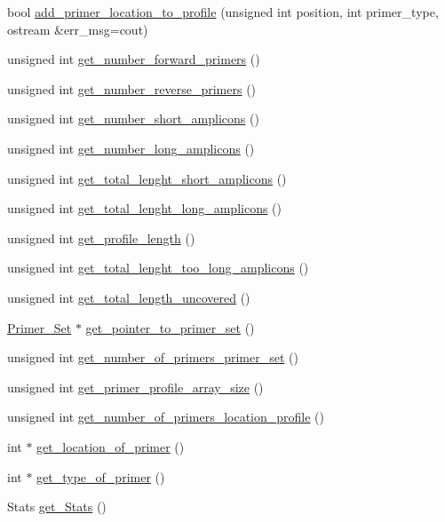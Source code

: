 \begin{DoxyCompactItemize}
\item 
bool \mbox{\hyperlink{class_p_c_r___profile_a95758e5dff688b7b85bd1009ba28e112}{add\+\_\+primer\+\_\+location\+\_\+to\+\_\+profile}} (unsigned int position, int primer\+\_\+type, ostream \&err\+\_\+msg=cout)
\item 
unsigned int \mbox{\hyperlink{class_p_c_r___profile_a5222753c5f4b1568f7254be8fbc7c862}{get\+\_\+number\+\_\+forward\+\_\+primers}} ()
\item 
unsigned int \mbox{\hyperlink{class_p_c_r___profile_a5470c4248e9c347b66ee1ad977d2a6f9}{get\+\_\+number\+\_\+reverse\+\_\+primers}} ()
\item 
unsigned int \mbox{\hyperlink{class_p_c_r___profile_ae1470db4482cb29be8e29b96f913023c}{get\+\_\+number\+\_\+short\+\_\+amplicons}} ()
\item 
unsigned int \mbox{\hyperlink{class_p_c_r___profile_a91a98d9005a63450de3f782c9374972a}{get\+\_\+number\+\_\+long\+\_\+amplicons}} ()
\item 
unsigned int \mbox{\hyperlink{class_p_c_r___profile_aa8f3e8fc43865af8734090436a0d729e}{get\+\_\+total\+\_\+lenght\+\_\+short\+\_\+amplicons}} ()
\item 
unsigned int \mbox{\hyperlink{class_p_c_r___profile_adf41a697d05489582745d650d4e7c956}{get\+\_\+total\+\_\+lenght\+\_\+long\+\_\+amplicons}} ()
\item 
unsigned int \mbox{\hyperlink{class_p_c_r___profile_ad25903940b769ad48abaf472175e5ccf}{get\+\_\+profile\+\_\+length}} ()
\item 
unsigned int \mbox{\hyperlink{class_p_c_r___profile_a0c37a463d8adedb60c5b4d8d213c182e}{get\+\_\+total\+\_\+lenght\+\_\+too\+\_\+long\+\_\+amplicons}} ()
\item 
unsigned int \mbox{\hyperlink{class_p_c_r___profile_abcd1baf20c93c633b00b1fbd3e662b8f}{get\+\_\+total\+\_\+length\+\_\+uncovered}} ()
\item 
\mbox{\hyperlink{class_primer___set}{Primer\+\_\+\+Set}} $\ast$ \mbox{\hyperlink{class_p_c_r___profile_a24577af6213a4f6ae4215d19836c5673}{get\+\_\+pointer\+\_\+to\+\_\+primer\+\_\+set}} ()
\item 
unsigned int \mbox{\hyperlink{class_p_c_r___profile_a3adc7245807935d0d10c7600593254a2}{get\+\_\+number\+\_\+of\+\_\+primers\+\_\+primer\+\_\+set}} ()
\item 
unsigned int \mbox{\hyperlink{class_p_c_r___profile_a43b9d518bca0cd7f37ce008fcfa1b37b}{get\+\_\+primer\+\_\+profile\+\_\+array\+\_\+size}} ()
\item 
unsigned int \mbox{\hyperlink{class_p_c_r___profile_a7b3b84627171a22a57366adc1992ff3d}{get\+\_\+number\+\_\+of\+\_\+primers\+\_\+location\+\_\+profile}} ()
\item 
int $\ast$ \mbox{\hyperlink{class_p_c_r___profile_a7f9b958200413a71f4edd93277da1765}{get\+\_\+location\+\_\+of\+\_\+primer}} ()
\item 
int $\ast$ \mbox{\hyperlink{class_p_c_r___profile_a6243b3536533df498c781f9e592a86db}{get\+\_\+type\+\_\+of\+\_\+primer}} ()
\item 
Stats \mbox{\hyperlink{class_p_c_r___profile_a05e64bbe69413cb969b31ffae46e6a10}{get\+\_\+\+Stats}} ()
\end{DoxyCompactItemize}


